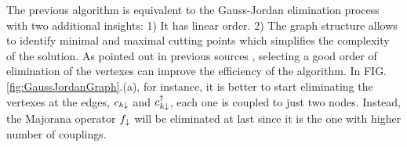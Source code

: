 \documentclass[showpacs,aps,prb,reprint,superscriptaddress]{revtex4-2}
\begin{document}
 
   
        

The previous algorithm is equivalent to the Gauss-Jordan elimination process with two additional insights: 1) It has linear order. 2) The graph structure allows to identify minimal and maximal cutting points which simplifies the complexity of the solution. As pointed out in previous sources \cite{spielman_algorithms_2010}, selecting a good order of elimination of the vertexes can improve the efficiency of the algorithm. In FIG. \ref{fig:GaussJordanGraph}.(a), for instance, it is better to start eliminating the vertexes at the edges, $c_{k\downarrow}$ and $c_{k\downarrow}^\dagger$, each one is coupled to just two nodes. Instead, the Majorana operator $f_\downarrow$ will be eliminated at last since it is the one with higher number of couplings.  
\end{document}
